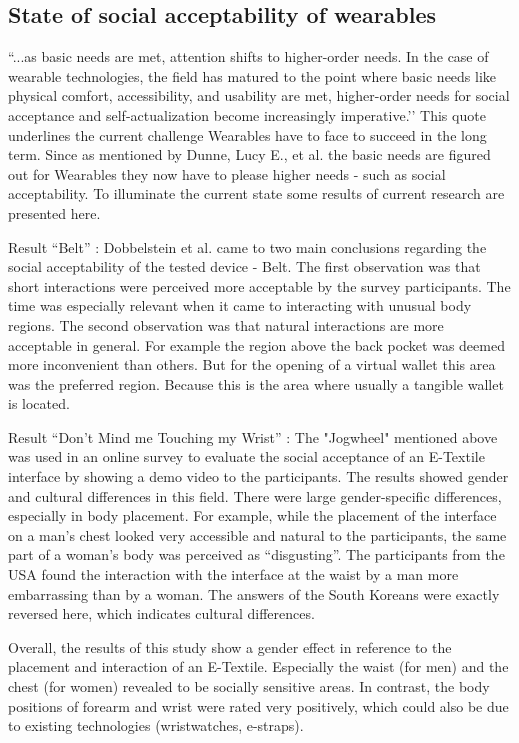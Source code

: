 \documentclass{sigchi}
\begin{document}
\subsection{State of social acceptability of wearables}
``...as basic needs are met, attention shifts to higher-order needs. In the case of wearable technologies, the field has matured to the point where basic needs like physical comfort, accessibility, and usability are met, higher-order needs for social acceptance and self-actualization become increasingly imperative.’’ \cite[p. 4162]{social-comfort} %
This quote underlines the current challenge Wearables have to face to succeed in the long term. Since as mentioned by Dunne, Lucy E., et al. \cite{social-comfort} the basic needs are figured out for Wearables they now have to please higher needs - such as social acceptability. To illuminate the current state some results of current research are presented here.


Result “Belt” \cite{belt} : Dobbelstein et al. came to two main conclusions regarding the social acceptability of the tested device - Belt. The first observation was that short interactions were perceived more acceptable by the survey participants. The time was especially relevant when it came to interacting with unusual body regions. The second observation was that natural interactions are more acceptable in general. For example the region above the back pocket was deemed more inconvenient than others. But for the opening of a virtual wallet this area was the preferred region. Because this is the area where usually a tangible wallet is located.

Result “Don’t Mind me Touching my Wrist” \cite{touch-wrist}: The "Jogwheel"  mentioned above was used in an online survey to evaluate the social acceptance of an E-Textile interface by showing a demo video to the participants. The results showed gender and cultural differences in this field. There were large gender-specific differences, especially in body placement. For example, while the placement of the interface on a man's chest looked very accessible and natural to the participants, the same part of a woman's body was perceived as “disgusting”. \cite{touch-wrist} The participants from the USA found the interaction with the interface at the waist by a man more embarrassing than by a woman. The answers of the South Koreans were exactly reversed here, which indicates cultural differences. \cite{touch-wrist}

Overall, the results of this study show a gender effect in reference to the placement and interaction of an E-Textile. Especially the waist (for men) and the chest (for women) revealed to be socially sensitive areas. In contrast, the body positions of forearm and wrist were rated very positively, which could also be due to existing technologies (wristwatches, e-straps).
\end{document}

